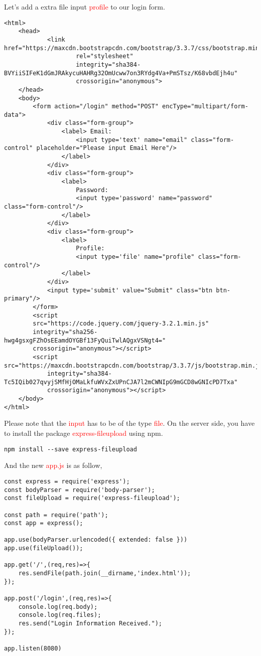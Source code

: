 \documentclass[a4paper]{article}
\begin{document}
Let's add a extra file input \textcolor{red}{profile} to our login form.
\begin{lstlisting}
<html>
    <head>
            <link href="https://maxcdn.bootstrapcdn.com/bootstrap/3.3.7/css/bootstrap.min.css" 
                    rel="stylesheet" 
                    integrity="sha384-BVYiiSIFeK1dGmJRAkycuHAHRg32OmUcww7on3RYdg4Va+PmSTsz/K68vbdEjh4u" 
                    crossorigin="anonymous">
    </head>
    <body>
        <form action="/login" method="POST" encType="multipart/form-data">
            <div class="form-group">
                <label> Email:
                    <input type='text' name="email" class="form-control" placeholder="Please input Email Here"/>
                </label>
            </div>
            <div class="form-group">
                <label>
                    Password:
                    <input type='password' name="password" class="form-control"/>
                </label>
            </div>
            <div class="form-group">
                <label>
                    Profile:
                    <input type='file' name="profile" class="form-control"/>
                </label>
            </div>
            <input type='submit' value="Submit" class="btn btn-primary"/>
        </form>
        <script
        src="https://code.jquery.com/jquery-3.2.1.min.js"
        integrity="sha256-hwg4gsxgFZhOsEEamdOYGBf13FyQuiTwlAQgxVSNgt4="
        crossorigin="anonymous"></script>
        <script src="https://maxcdn.bootstrapcdn.com/bootstrap/3.3.7/js/bootstrap.min.js" 
            integrity="sha384-Tc5IQib027qvyjSMfHjOMaLkfuWVxZxUPnCJA7l2mCWNIpG9mGCD8wGNIcPD7Txa" 
            crossorigin="anonymous"></script>
    </body>
</html>
\end{lstlisting}
Please note that the \textcolor{red}{input} has to be of the type \textcolor{red}{file}. On the server side, you have to install the package \textcolor{red}{express-fileupload} using npm.
\begin{lstlisting}
npm install --save express-fileupload
\end{lstlisting}
And the new \textcolor{red}{app.js} is as follow,
\begin{lstlisting}
const express = require('express');
const bodyParser = require('body-parser');
const fileUpload = require('express-fileupload');

const path = require('path');
const app = express();

app.use(bodyParser.urlencoded({ extended: false }))
app.use(fileUpload());

app.get('/',(req,res)=>{
	res.sendFile(path.join(__dirname,'index.html'));
});

app.post('/login',(req,res)=>{
	console.log(req.body);
	console.log(req.files);
	res.send("Login Information Received.");
});

app.listen(8080)
\end{lstlisting}
\end{document}
